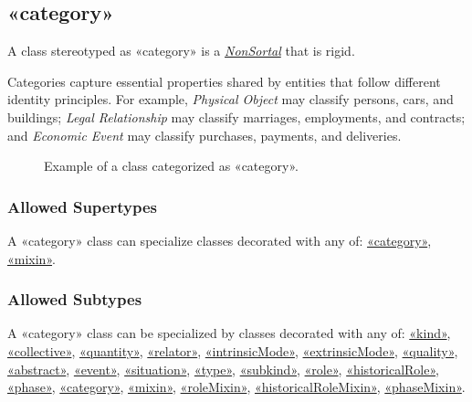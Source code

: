 \subsection{«category»}
\label{stereotype:category}

A class stereotyped as «category» is a \hyperref[stereotype:nonSortal]{\textit{NonSortal}} that is rigid.

Categories capture essential properties shared by entities that follow different identity principles. For example, \textit{Physical Object} may classify persons, cars, and buildings; \textit{Legal Relationship} may classify marriages, employments, and contracts; and \textit{Economic Event} may classify purchases, payments, and deliveries.


\begin{figure}[h]
    \centering
    
    \caption{Example of a class categorized as «category».}
    \label{fig:category-example}
\end{figure}


\subsubsection{Allowed Supertypes}

A «category» class can specialize classes decorated with any of: \hyperref[stereotype:category]{«category»}, \hyperref[stereotype:mixin]{«mixin»}.

\subsubsection{Allowed Subtypes}

A «category» class can be specialized by classes decorated with any of:
\hyperref[stereotype:kind]{«kind»}, \hyperref[stereotype:collective]{«collective»}, \hyperref[stereotype:quantity]{«quantity»}, \hyperref[stereotype:relator]{«relator»}, \hyperref[stereotype:intrinsicMode]{«intrinsicMode»}, \hyperref[stereotype:extrinsicMode]{«extrinsicMode»}, \hyperref[stereotype:quality]{«quality»}, \hyperref[stereotype:abstract]{«abstract»}, \hyperref[stereotype:event]{«event»}, \hyperref[stereotype:situation]{«situation»}, \hyperref[stereotype:type]{«type»}, \hyperref[stereotype:subkind]{«subkind»}, \hyperref[stereotype:role]{«role»}, \hyperref[stereotype:historicalRole]{«historicalRole»}, \hyperref[stereotype:phase]{«phase»}, \hyperref[stereotype:category]{«category»}, \hyperref[stereotype:mixin]{«mixin»}, \hyperref[stereotype:roleMixin]{«roleMixin»}, \hyperref[stereotype:historicalRoleMixin]{«historicalRoleMixin»}, \hyperref[stereotype:phaseMixin]{«phaseMixin»}.

